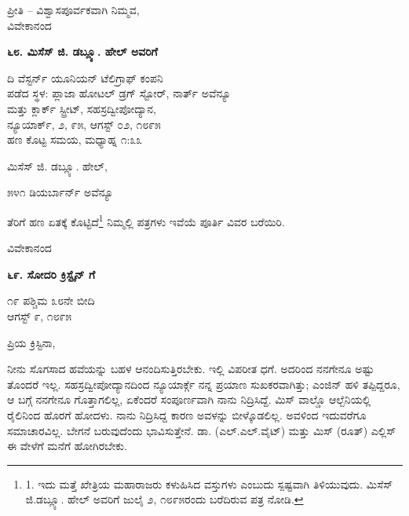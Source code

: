 \begin{flushright}
ಪ್ರೀತಿ – ವಿಶ್ವಾಸಪೂರ್ವಕವಾಗಿ ನಿಮ್ಮವ,\\ವಿವೇಕಾನಂದ
\end{flushright}

\begin{center}
\textbf{೬೮. ಮಿಸೆಸ್ ಜಿ. ಡಬ್ಲ್ಯೂ. ಹೇಲ್ ಅವರಿಗೆ}
\end{center}

\begin{flushright}
ದಿ ವೆಸ್ಟರ್ನ್ ಯೂನಿಯನ್ ಟೆಲಿಗ್ರಾಫ್ ಕಂಪನಿ\\ಪಡೆದ ಸ್ಥಳ: ಪ್ಲಾಜಾ ಹೋಟಲ್ ಡ್ರಗ್ ಸ್ಟೋರ್, ನಾರ್ತ್ ಅವೆನ್ಯೂ\\ಮತ್ತು ಕ್ಲಾರ್ಕ್ ಸ್ಟ್ರೀಟ್, ಸಹಸ್ರದ್ವೀಪೋದ್ಯಾನ,\\ನ್ಯೂಯಾರ್ಕ್, ೨, ೯೫, ಆಗಸ್ಟ್ ೦೨, ೧೮೯೫\\ ಹಣ ಕೊಟ್ಟ ಸಮಯ, ಮಧ್ಯಾಹ್ನ ೧:೩೩
\end{flushright}

ಮಿಸೆಸ್ ಜಿ. ಡಬ್ಲ್ಯೂ. ಹೇಲ್,

\begin{flushright}
೫೪೧ ಡಿಯರ್ಬಾರ್ನ್ ಅವೆನ್ಯೂ
\end{flushright}

ತೆರಿಗೆ ಹಣ ಏತಕ್ಕೆ ಕೊಟ್ಟಿದೆ\footnote{1. ಇದು ಮತ್ತೆ ಖೇತ್ರಿಯ ಮಹಾರಾಜರು ಕಳುಹಿಸಿದ ವಸ್ತುಗಳು ಎಂಬುದು ಸ್ಪಷ್ಟವಾಗಿ ತಿಳಿಯುವುದು. ಮಿಸೆಸ್ ಜಿ.ಡಬ್ಲ್ಯೂ. ಹೇಲ್ ಅವರಿಗೆ ಜುಲೈ ೨, ೧೮೯೫ರಂದು ಬರೆದಿರುವ ಪತ್ರ ನೋಡಿ.} ನಿಮ್ಮಲ್ಲಿ ಪತ್ರಗಳು ಇವೆಯೆ ಪೂರ್ತಿ ವಿವರ ಬರೆಯಿರಿ.

\begin{flushright}
ವಿವೇಕಾನಂದ
\end{flushright}

\begin{center}
\textbf{೬೯. ಸೋದರಿ ಕ್ರಿಸ್ಟೈನ್ ಗೆ}
\end{center}

\begin{flushright}
೧೯ ಪಶ್ಚಿಮ ೩೮ನೇ ಬೀದಿ\\ಆಗಸ್ಟ್ ೯, ೧೮೯೫
\end{flushright}

ಪ್ರಿಯ ಕ್ರಿಸ್ಟಿನಾ,

ನೀನು ಸೊಗಸಾದ ಹವೆಯನ್ನು ಬಹಳ ಆನಂದಿಸುತ್ತಿರಬೇಕು. ಇಲ್ಲಿ ವಿಪರೀತ ಧಗೆ. ಅದರಿಂದ ನನಗೇನೂ ಅಷ್ಟು ತೊಂದರೆ ಇಲ್ಲ. ಸಹಸ್ರದ್ವೀಪೋದ್ಯಾನದಿಂದ ನ್ಯೂಯಾರ್ಕ್ಗೆ ನನ್ನ ಪ್ರಯಾಣ ಸುಖಕರವಾಗಿತ್ತು; ಎಂಜಿನ್ ಹಳಿ ತಪ್ಪಿದ್ದರೂ, ಆ ಬಗ್ಗೆ ನನಗೇನೂ ಗೊತ್ತಾಗಲಿಲ್ಲ, ಏಕೆಂದರೆ ಸಂಪೂರ್ಣವಾಗಿ ನಾನು ನಿದ್ರಿಸಿದ್ದೆ. ಮಿಸ್ ವಾಲ್ಡೊ ಆಲ್ಬೆನಿಯಲ್ಲಿ ರೈಲಿನಿಂದ ಹೊರಗೆ ಹೋದಳು. ನಾನು ನಿದ್ರಿಸಿದ್ದ ಕಾರಣ ಅವಳನ್ನು ಬೀಳ್ಕೊಡಲಿಲ್ಲ. ಅವಳಿಂದ ಇದುವರೆಗೂ ಸಮಾಚಾರವಿಲ್ಲ. ಬೇಗನೆ ಬರುವುದೆಂದು ಭಾವಿಸುತ್ತೇನೆ. ಡಾ. (ಎಲ್.ಎಲ್.ವೈಟ್) ಮತ್ತು ಮಿಸ್ (ರೂತ್) ಎಲ್ಲಿಸ್ ಈ ವೇಳೆಗೆ ಮನೆಗೆ ಹೋಗಿರಬೇಕು.

